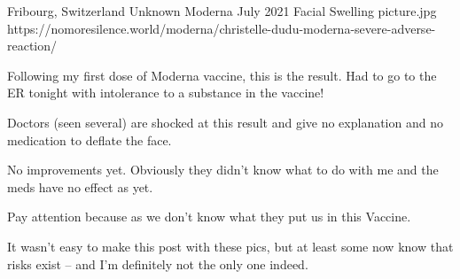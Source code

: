 {Fribourg, Switzerland}
{Unknown}
{Moderna}
{July 2021}
{Facial Swelling}
{picture.jpg}
{https://nomoresilence.world/moderna/christelle-dudu-moderna-severe-adverse-reaction/}
{

Following my first dose of Moderna vaccine, this is the result. Had to go to the
ER tonight with intolerance to a substance in the vaccine!

Doctors (seen several) are shocked at this result and give no explanation and no
medication to deflate the face.

No improvements yet. Obviously they didn’t know what to do with me and the meds
have no effect as yet.

Pay attention because as we don’t know what they put us in this Vaccine.

It wasn’t easy to make this post with these pics, but at least some now know
that risks exist – and I’m definitely not the only one indeed.

}

